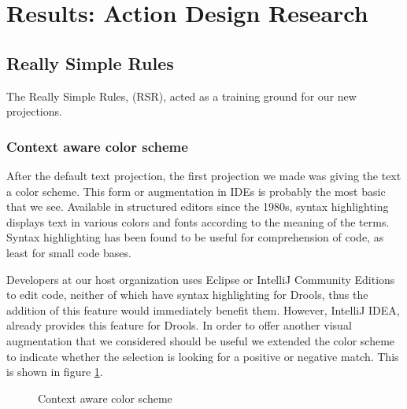 \section{Results: Action Design Research}\label{section:Results_ADR}

\subsection{Really Simple Rules}

The Really Simple Rules, (RSR), acted as a training ground for our new projections.

\subsubsection{Context aware color scheme}
After the default text projection, the first projection we made was giving the text a color scheme.
This form or augmentation in IDEs is probably the most basic that we see.
Available in structured editors since the 1980s\cite{cowlishaw1987lexx}, syntax highlighting displays text in various colors and fonts according to the meaning of the terms.
Syntax highlighting has been found to be useful for comprehension of code, as least for small code bases\cite{sarkar2015impact}.

Developers at our host organization uses Eclipse or IntelliJ Community Editions to edit code, neither of which have syntax highlighting for Drools, thus the addition of this feature would immediately benefit them.
However, IntelliJ IDEA, already provides this feature for Drools.
In order to offer another visual augmentation that we considered should be useful we extended the color scheme to indicate whether the selection is looking for a positive or negative match.
This is shown in figure \ref{fig:colorscheme}.

\begin{figure}[h]
    \centering
    \caption{Context aware color scheme}
    \label{fig:colorscheme}
\end{figure}

